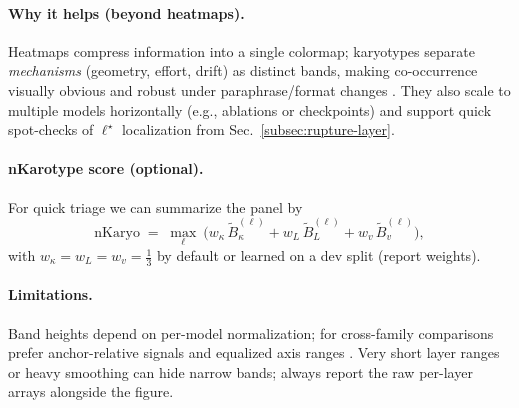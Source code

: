 \documentclass[11pt]{article}
\begin{document}
\paragraph{Why it helps (beyond heatmaps).}
Heatmaps compress information into a single colormap; karyotypes separate \emph{mechanisms} (geometry, effort, drift) as distinct bands, making co-occurrence visually obvious and robust under paraphrase/format changes \citep{ribeiro2020checklist,iyyer2018scpn}.
They also scale to multiple models horizontally (e.g., ablations or checkpoints) and support quick spot-checks of $\ell^\star$ localization from Sec.~\ref{subsec:rupture-layer}.

\paragraph{nKarotype score (optional).}
For quick triage we can summarize the panel by
\[
\mathrm{nKaryo} \;=\; \max_{\ell}\ \big( w_\kappa\,\widetilde{B}_\kappa^{(\ell)} + w_L\,\widetilde{B}_L^{(\ell)} + w_v\,\widetilde{B}_v^{(\ell)} \big),
\]
with $w_\kappa=w_L=w_v=\tfrac{1}{3}$ by default or learned on a dev split (report weights).

\paragraph{Limitations.}
Band heights depend on per-model normalization; for cross-family comparisons prefer anchor-relative signals and equalized axis ranges \citep{kornblith2019cka}.
Very short layer ranges or heavy smoothing can hide narrow bands; always report the raw per-layer arrays alongside the figure.
\end{document}
